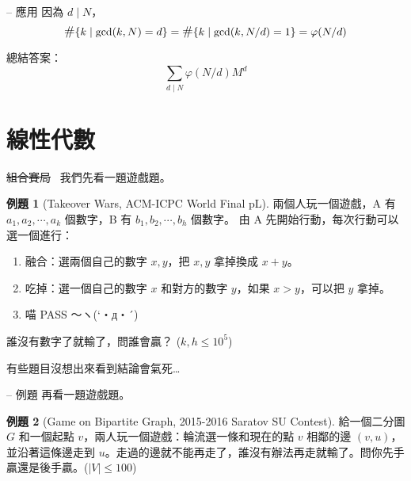 \documentclass[notheorems,xcolor=dvipsnames]{beamer}
\newcommand\abs[1]{\left\lvert #1 \right\rvert}
\renewcommand*{\sharp}{\mathlarger{\#}}
\theoremstyle{definition}
\newtheorem{problem}{例題}
\begin{document}
\begin{frame}{{\secname} -- 應用}
  因為 $d \mid N$，
  \[ \sharp \{ k \mid \gcd(k, N) = d \} = \sharp \{ k \mid \gcd(k, N/d) = 1 \} = \varphi(N/d) \]
  \pause

  \bigskip
  總結答案：
  \[\sum_{d \mid N} \varphi(N/d) M^{d} \]

\end{frame}

\section{線性代數}

\begin{frame}{\sout{組合賽局}~{\secname}}
  我們先看一題遊戲題。
  \begin{problem}[Takeover Wars, ACM-ICPC World Final pL]
    \small
    兩個人玩一個遊戲，A 有 $a_1, a_2, \cdots, a_k$ 個數字，B 有 $b_1, b_2, \cdots, b_h$ 個數字。
    由 A 先開始行動，每次行動可以選一個進行：
    \begin{enumerate}
      \item 融合：選兩個自己的數字 $x, y$，把 $x, y$ 拿掉換成 $x+y$。
      \item 吃掉：選一個自己的數字 $x$ 和對方的數字 $y$，如果 $x > y$，可以把 $y$ 拿掉。
      \item {\SHSTW 喵 PASS ～ヽ(`・д・´)}
    \end{enumerate}
    誰沒有數字了就輸了，問誰會贏？ ($k, h \leq 10^5$)
  \end{problem} \pause

  有些題目沒想出來看到結論會氣死…
\end{frame}

\begin{frame}{{\secname} -- 例題}
  再看一題遊戲題。\pause

  \begin{problem}[Game on Bipartite Graph, {\small 2015-2016 Saratov SU Contest}]
  給一個二分圖 $G$ 和一個起點 $v$，兩人玩一個遊戲：輪流選一條和現在的點 $v$ 相鄰的邊 $(v, u)$，
  並沿著這條邊走到 $u$。走過的邊就不能再走了，誰沒有辦法再走就輸了。問你先手贏還是後手贏。($\abs{V} \leq 100$)
  \end{problem}
\end{frame}
\end{document}
